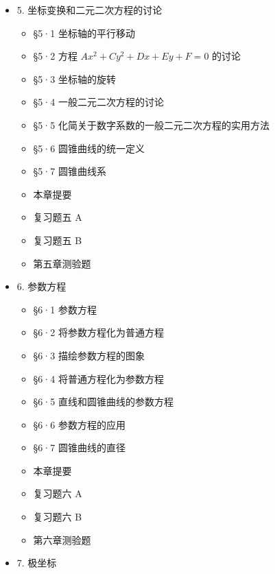 \begin{itemize}
\begin{itemize}
    \begin{itemize}
    \tightlist
    \item
      §4·19 曲线的切线
    \item
      §4·20 切线的斜率
    \item
      §4·21 切线的方程
    \item
      §4·22 已知斜率的切线方程
    \item
      §4·23 圆锥曲线的切线和法线的性质
    \end{itemize}
  \item
    本章提要
  \item
    复习题四 A
  \item
    复习题四 B
  \item
    第四章测验题
  \end{itemize}
\item
  5. 坐标变换和二元二次方程的讨论

  \begin{itemize}
  \tightlist
  \item
    §5·1 坐标轴的平行移动
  \item
    §5·2 方程 \(Ax^2 + Cy^2 + Dx + Ey + F = 0\) 的讨论
  \item
    §5·3 坐标轴的旋转
  \item
    §5·4 一般二元二次方程的讨论
  \item
    §5·5 化简关于数字系数的一般二元二次方程的实用方法
  \item
    §5·6 圆锥曲线的统一定义
  \item
    §5·7 圆锥曲线系
  \item
    本章提要
  \item
    复习题五 A
  \item
    复习题五 B
  \item
    第五章测验题
  \end{itemize}
\item
  6. 参数方程

  \begin{itemize}
  \tightlist
  \item
    §6·1 参数方程
  \item
    §6·2 将参数方程化为普通方程
  \item
    §6·3 描绘参数方程的图象
  \item
    §6·4 将普通方程化为参数方程
  \item
    §6·5 直线和圆锥曲线的参数方程
  \item
    §6·6 参数方程的应用
  \item
    §6·7 圆锥曲线的直径
  \item
    本章提要
  \item
    复习题六 A
  \item
    复习题六 B
  \item
    第六章测验题
  \end{itemize}
\item
  7. 极坐标


\end{itemize}
